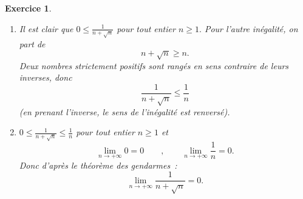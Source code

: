 \documentclass[10pt]{article}
\newtheorem{exo}{Exercice}
\begin{document}
\begin{exo}


\begin{enumerate}
\item Il est clair que $0\leq \frac{1}{n+\sqrt{n}}$ pour tout entier $n\geq 1.$ Pour l'autre inégalité, on part de \[n+\sqrt{n}\geq n.\] Deux nombres strictement positifs sont rangés en sens contraire de leurs inverses, donc
\[\frac{1}{n+\sqrt{n}}\leq \frac{1}{n}\] (\danger en prenant l'inverse, le sens de l'inégalité est renversé).

\item $0\leq \frac{1}{n+\sqrt{n}}\leq \frac{1}{n}$ pour tout entier $n\geq 1$ et
\[\lim\limits_{n\to +\infty}0=0\qquad , \qquad \lim\limits_{n\to +\infty}\frac{1}{n}=0.\] Donc d'après le théorème des gendarmes~:
\[\lim\limits_{n\to +\infty}\dfrac{1}{n+\sqrt{n}}=0.\]
\end{enumerate}

\end{exo}
\end{document}

